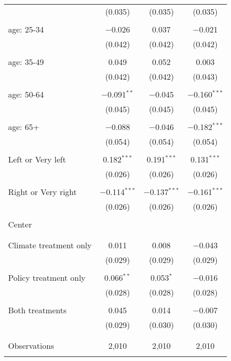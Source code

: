 \begin{tabular}{@{\extracolsep{5pt}}lccc}
  & (0.035) & (0.035) & (0.035) \\ 
  & & & \\ 
 age: 25-34 & $-$0.026 & 0.037 & $-$0.021 \\ 
  & (0.042) & (0.042) & (0.042) \\ 
  & & & \\ 
 age: 35-49 & 0.049 & 0.052 & 0.003 \\ 
  & (0.042) & (0.042) & (0.043) \\ 
  & & & \\ 
 age: 50-64 & $-$0.091$^{**}$ & $-$0.045 & $-$0.160$^{***}$ \\ 
  & (0.045) & (0.045) & (0.045) \\ 
  & & & \\ 
 age: 65+ & $-$0.088 & $-$0.046 & $-$0.182$^{***}$ \\ 
  & (0.054) & (0.054) & (0.054) \\ 
  & & & \\ 
 Left or Very left & 0.182$^{***}$ & 0.191$^{***}$ & 0.131$^{***}$ \\ 
  & (0.026) & (0.026) & (0.026) \\ 
  & & & \\ 
 Right or Very right & $-$0.114$^{***}$ & $-$0.137$^{***}$ & $-$0.161$^{***}$ \\ 
  & (0.026) & (0.026) & (0.026) \\ 
  & & & \\ 
 Center &  &  &  \\ 
  &  &  &  \\ 
  & & & \\ 
 Climate treatment only & 0.011 & 0.008 & $-$0.043 \\ 
  & (0.029) & (0.029) & (0.029) \\ 
  & & & \\ 
 Policy treatment only & 0.066$^{**}$ & 0.053$^{*}$ & $-$0.016 \\ 
  & (0.028) & (0.028) & (0.028) \\ 
  & & & \\ 
 Both treatments & 0.045 & 0.014 & $-$0.007 \\ 
  & (0.029) & (0.030) & (0.030) \\ 
  & & & \\ 
\hline \\[-1.8ex] 

Observations & 2,010 & 2,010 & 2,010 \\ 
\hline 
\hline \\[-1.8ex] 
\end{tabular} 